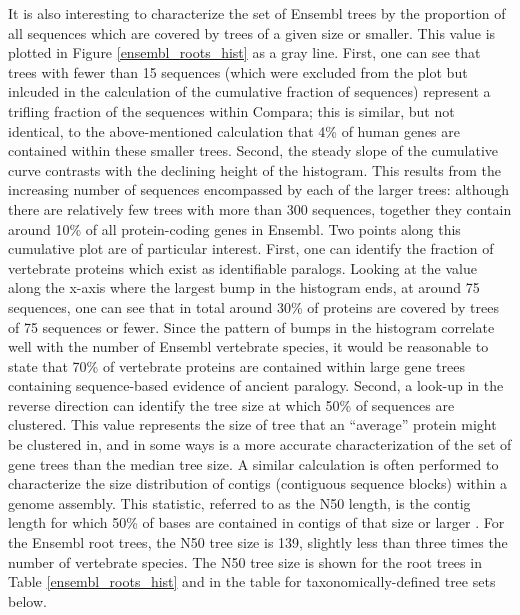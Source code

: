 It is also interesting to characterize the set of Ensembl trees by the
proportion of all sequences which are covered by trees of a given size
or smaller. This value is plotted in Figure \ref{ensembl_roots_hist}
as a gray line. First, one can see that trees with fewer than 15
sequences (which were excluded from the plot but inlcuded in the
calculation of the cumulative fraction of sequences) represent a
trifling fraction of the sequences within Compara; this is similar,
but not identical, to the above-mentioned calculation that 4\% of
human genes are contained within these smaller trees. Second, the
steady slope of the cumulative curve contrasts with the declining
height of the histogram. This results from the increasing number of
sequences encompassed by each of the larger trees: although there are
relatively few trees with more than 300 sequences, together they
contain around 10\% of all protein-coding genes in Ensembl. Two points
along this cumulative plot are of particular interest. First, one can
identify the fraction of vertebrate proteins which exist as
identifiable paralogs. Looking at the value along the x-axis where the
largest bump in the histogram ends, at around 75 sequences, one can
see that in total around 30\% of proteins are covered by trees of 75
sequences or fewer. Since the pattern of bumps in the histogram
correlate well with the number of Ensembl vertebrate species, it would
be reasonable to state that 70\% of vertebrate proteins are contained
within large gene trees containing sequence-based evidence of ancient
paralogy. Second, a look-up in the reverse direction can identify the
tree size at which 50\% of sequences are clustered. This value
represents the size of tree that an ``average'' protein might be
clustered in, and in some ways is a more accurate characterization of
the set of gene trees than the median tree size. A similar calculation
is often performed to characterize the size distribution of contigs
(contiguous sequence blocks) within a genome assembly. This statistic,
referred to as the N50 length, is the contig length for which 50\% of
bases are contained in contigs of that size or larger
\citep{Miller2010}. For the Ensembl root trees, the N50 tree size is 139,
slightly less than three times the number of vertebrate species. The
N50 tree size is shown for the root trees in Table
\ref{ensembl_roots_hist} and in the table for taxonomically-defined
tree sets below.

